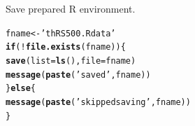 \documentclass{article}\usepackage[]{graphicx}\usepackage[]{color}
\makeatletter
\newcommand{\hlstr}[1]{\textcolor[rgb]{0.192,0.494,0.8}{#1}}%
\newcommand{\hlopt}[1]{\textcolor[rgb]{0,0,0}{#1}}%
\newcommand{\hlstd}[1]{\textcolor[rgb]{0.345,0.345,0.345}{#1}}%
\newcommand{\hlkwa}[1]{\textcolor[rgb]{0.161,0.373,0.58}{\textbf{#1}}}%
\newcommand{\hlkwb}[1]{\textcolor[rgb]{0.69,0.353,0.396}{#1}}%
\newcommand{\hlkwc}[1]{\textcolor[rgb]{0.333,0.667,0.333}{#1}}%
\newcommand{\hlkwd}[1]{\textcolor[rgb]{0.737,0.353,0.396}{\textbf{#1}}}%
\newenvironment{kframe}{%
 \def\at@end@of@kframe{}%
 \ifinner\ifhmode%
  \def\at@end@of@kframe{\end{minipage}}%
  \begin{minipage}{\columnwidth}%
 \fi\fi%
 \def\FrameCommand##1{\hskip\@totalleftmargin \hskip-\fboxsep
 \colorbox{shadecolor}{##1}\hskip-\fboxsep
     \hskip-\linewidth \hskip-\@totalleftmargin \hskip\columnwidth}%
 \MakeFramed {\advance\hsize-\width
   \@totalleftmargin\z@ \linewidth\hsize
   \@setminipage}}%
 {\par\unskip\endMakeFramed%
 \at@end@of@kframe}
\newenvironment{knitrout}{}{} %
\makeatother
\begin{document}
Save prepared R environment.
\begin{knitrout}
\color{fgcolor}\begin{kframe}
\begin{alltt}
\hlstd{fname} \hlkwb{<-} \hlstr{'thRS500.Rdata'}
\hlkwa{if}\hlstd{(}\hlopt{!}\hlkwd{file.exists}\hlstd{(fname)) \{}
   \hlkwd{save}\hlstd{(}\hlkwc{list}\hlstd{=}\hlkwd{ls}\hlstd{(),}\hlkwc{file}\hlstd{=fname)}
   \hlkwd{message}\hlstd{(}\hlkwd{paste}\hlstd{(}\hlstr{'saved'}\hlstd{,fname))}
\hlstd{\}} \hlkwa{else} \hlstd{\{}
   \hlkwd{message}\hlstd{(}\hlkwd{paste}\hlstd{(}\hlstr{'skipped saving'}\hlstd{,fname))}
\hlstd{\}}
\end{alltt}
\end{kframe}
\end{knitrout}
\end{document}
